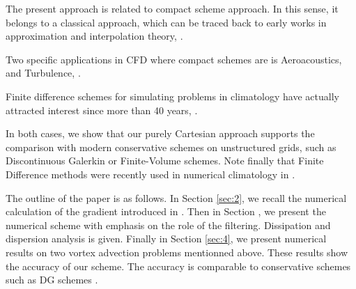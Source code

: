 The present approach is related to compact scheme
approach. In this sense, it belongs 
to a classical approach, which can
be traced back to early works
in approximation and interpolation theory, \cite{Collatz}.

Two specific applications in CFD where compact schemes
are  is Aeroacoustics, \cite{Visbal-Gaitonde, Tam-Webb} and Turbulence, \cite{Lele, Kim-Moin}.

Finite difference schemes 
for simulating problems in climatology have
actually attracted interest since 
more than 40 years, \cite{Arakawa}.

In both cases, we show 
that our purely Cartesian approach supports
the comparison with modern conservative schemes on unstructured grids, such as 
Discontinuous Galerkin or Finite-Volume schemes.
Note finally that Finite Difference methods were recently used
in numerical climatology in \cite{Ghader-Nordstrom}.

The outline of the paper is as follows.
In Section \ref{sec:2}, we recall the numerical calculation
of the gradient introduced in \cite{Croisille-10}. Then in Section 
\label{sec:3}, we present the numerical scheme with emphasis 
on the role of the filtering. Dissipation and dispersion analysis 
is given. Finally in Section \ref{sec:4}, we present 
numerical results on two vortex advection problems mentionned above.
These results show the accuracy of our scheme.
The accuracy is comparable to conservative schemes such as DG schemes \cite{Nair-Jablonowski}.
